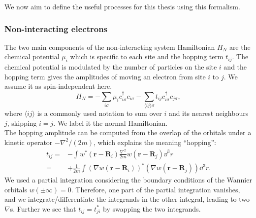 \documentclass[../main.tex]{subfile}
\begin{document}
We now aim to define the useful processes for this thesis using this formalism.

\subsubsection{Non-interacting electrons}
The two main components of the non-interacting system Hamiltonian $H_N$ are the chemical potential $\mu_i$ which is specific to each site and the hopping term $t_{ij}$.
The chemical potential is modulated by the number of particles on the site $i$ and the hopping term gives the amplitudes of moving an electron from site $i$ to $j$.
We assume it as spin-independent here.\\
\begin{equation}\label{eq:Ham_Normal}
    H_N = - \sum_{i \sigma} \mu_i c_{i\sigma}^{\dagger} c_{i\sigma} - \sum_{\langle ij\rangle \sigma} t_{ij} c_{i\sigma}^{\dagger} c_{j\sigma},
\end{equation}
where $\langle ij\rangle$ is a commonly used notation to sum over $i$ and its nearest neighbours $j$, skipping $i=j$. We label it the normal
Hamiltonian.\\

The hopping amplitude can be computed from the overlap of the orbitals under a kinetic operator $-\nabla^2/(2m)$, which explains the meaning ``hopping'':
\begin{align*}
    t_{ij} =& -\int w^{\ast}(\bm{r} - \bm{R}_i) \frac{\nabla^2}{2m} w(\bm{r} - \bm{R}_j) \dd^3r\\
           =& +\frac{1}{2m}\int \left(\nabla w(\bm{r} - \bm{R}_i)\right)^{\ast} \left(\nabla w(\bm{r} - \bm{R}_j)\right) \dd^3r.
\end{align*}
We used a partial integration considering the boundary conditions of the Wannier orbitals $w(\pm \infty) = 0$. Therefore, one part of the partial integration vanishes,
and we integrate/differentiate the integrands in the other integral, leading to two $\nabla$s. Further we see that $t_{ij} = t_{ji}^{\ast}$ by swapping the two integrands.\\
\end{document}
